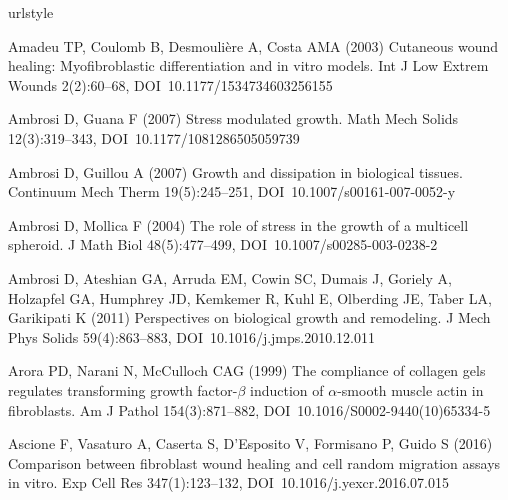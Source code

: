 \begin{thebibliography}{124}
\providecommand{\natexlab}[1]{#1}
\providecommand{\url}[1]{{#1}}
\providecommand{\urlprefix}{URL }
\expandafter\ifx\csname urlstyle\endcsname\relax
  \providecommand{\doi}[1]{DOI~\discretionary{}{}{}#1}\else
  \providecommand{\doi}{DOI~\discretionary{}{}{}\begingroup
  \urlstyle{rm}\Url}\fi
\providecommand{\eprint}[2][]{\url{#2}}

Amadeu TP, Coulomb B, Desmouli\`{e}re A, Costa AMA (2003) Cutaneous wound
  healing: Myofibroblastic differentiation and in vitro models. Int J Low
  Extrem Wounds 2(2):60--68, \doi{10.1177/1534734603256155}

Ambrosi D, Guana F (2007) Stress modulated growth. Math Mech Solids
  12(3):319--343, \doi{10.1177/1081286505059739}

Ambrosi D, Guillou A (2007) Growth and dissipation in biological tissues.
  Continuum Mech Therm 19(5):245--251, \doi{10.1007/s00161-007-0052-y}

Ambrosi D, Mollica F (2004) The role of stress in the growth of a multicell
  spheroid. J Math Biol 48(5):477--499, \doi{10.1007/s00285-003-0238-2}

Ambrosi D, Ateshian GA, Arruda EM, Cowin SC, Dumais J, Goriely A, Holzapfel GA,
  Humphrey JD, Kemkemer R, Kuhl E, Olberding JE, Taber LA, Garikipati K (2011)
  Perspectives on biological growth and remodeling. J Mech Phys Solids
  59(4):863--883, \doi{10.1016/j.jmps.2010.12.011}

Arora PD, Narani N, McCulloch CAG (1999) The compliance of collagen gels
  regulates transforming growth factor-$\beta$ induction of $\alpha$-smooth
  muscle actin in fibroblasts. Am J Pathol 154(3):871--882,
  \doi{10.1016/S0002-9440(10)65334-5}

Ascione F, Vasaturo A, Caserta S, D'Esposito V, Formisano P, Guido S (2016)
  Comparison between fibroblast wound healing and cell random migration assays
  in vitro. Exp Cell Res 347(1):123--132, \doi{10.1016/j.yexcr.2016.07.015}


\end{thebibliography}
